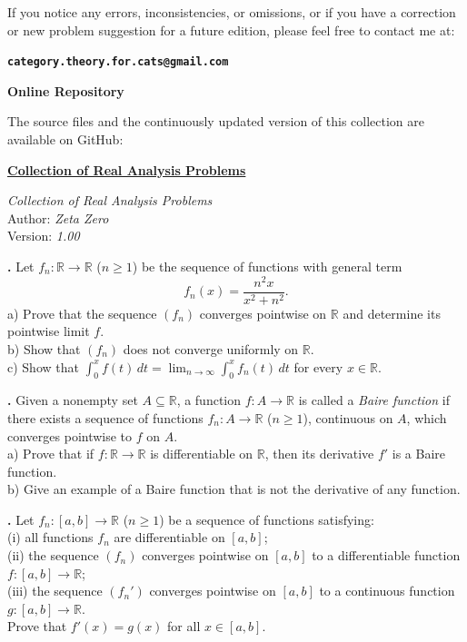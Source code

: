 \documentclass[12pt]{article}
\newcounter{raprob}
\newcommand{\raproblem}[1]{%
  \stepcounter{raprob}%
  \begin{problem}
  \textbf{\theraprob.} #1
  \end{problem}
}
\begin{document}
If you notice any errors, inconsistencies, or omissions, or if you have a
correction or new problem suggestion for a future edition, please feel free to contact me at:

\noindent
\textbf{\texttt{category.theory.for.cats@gmail.com}}

\medskip

\noindent
\textbf{Online Repository}

\medskip

The source files and the continuously updated version of this collection are available on GitHub:

\medskip

\noindent
\href{https://github.com/ZetaZero-0/Collection-of-Problems}
{\textbf{Collection of Real Analysis Problems}}

\vfill

\begin{center}
	\small\textit{Collection of Real Analysis Problems}\\
	\small Author: \textit{Zeta Zero}\\
	\small Version: \textit{1.00}
\end{center}

\newpage

\raproblem{Let $f_n : \mathbb{R} \to \mathbb{R}$ ($n \ge 1$) be the sequence of functions with general term
\[
f_n(x) = \frac{n^2 x}{x^2 + n^2}.
\]
a) Prove that the sequence $(f_n)$ converges pointwise on $\mathbb{R}$ and determine its pointwise limit $f$.\\
b) Show that $(f_n)$ does not converge uniformly on $\mathbb{R}$.\\
c) Show that $\displaystyle\int_0^x f(t)\,dt = \lim_{n \to \infty} \int_0^x f_n(t)\,dt$ for every $x \in \mathbb{R}$.}

\raproblem{Given a nonempty set $A \subseteq \mathbb{R}$, a function $f : A \to \mathbb{R}$ is called a \emph{Baire function} if there exists a sequence of functions $f_n : A \to \mathbb{R}$ ($n \ge 1$), continuous on $A$, which converges pointwise to $f$ on $A$.\\
a) Prove that if $f : \mathbb{R} \to \mathbb{R}$ is differentiable on $\mathbb{R}$, then its derivative $f'$ is a Baire function.\\
b) Give an example of a Baire function that is not the derivative of any function.}

\raproblem{Let $f_n : [a,b] \to \mathbb{R}$ ($n \ge 1$) be a sequence of functions satisfying:\\
(i) all functions $f_n$ are differentiable on $[a,b]$;\\
(ii) the sequence $(f_n)$ converges pointwise on $[a,b]$ to a differentiable function $f : [a,b] \to \mathbb{R}$;\\
(iii) the sequence $(f_n')$ converges pointwise on $[a,b]$ to a continuous function $g : [a,b] \to \mathbb{R}$.\\
Prove that $f'(x) = g(x)$ for all $x \in [a,b]$.}
\end{document}
